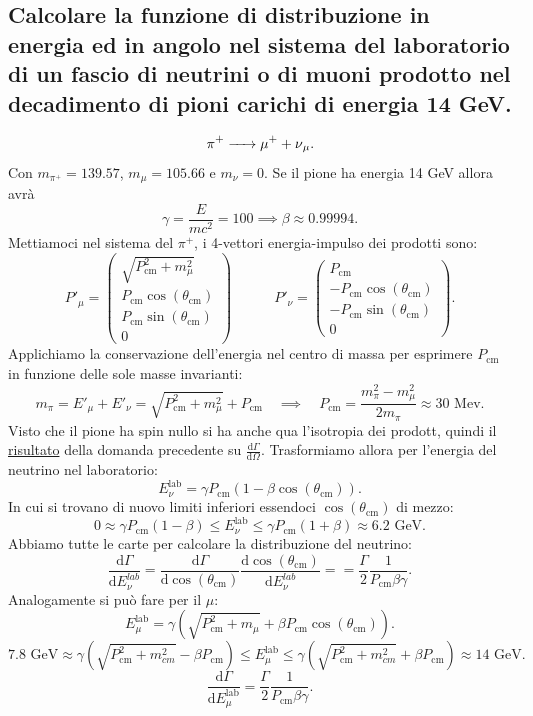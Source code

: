 \subsection[\hspace{2mm} ]{Calcolare la funzione di distribuzione in energia ed in angolo nel sistema del laboratorio di un fascio di neutrini o di muoni prodotto nel decadimento di pioni carichi di energia 14 GeV.}
\[
	\ce{\ce{\pi^+} -> \ce{\mu^+} + \ce{\nu_{\mu}}}
.\] 
Con  $m_{\pi^+} = 139.57$, $m_{\mu}=105.66$ e $m_{\nu}=0$. Se il pione ha energia 14 GeV allora avrà
\[
\gamma = \frac{E}{mc^2} = 100 \implies \beta \approx 0.99994
.\] 
Mettiamoci nel sistema del $\pi^+$, i 4-vettori energia-impulso dei prodotti sono:
\[
P'_{\mu} =  
\begin{pmatrix}
	\sqrt{P_{\text{cm}}^2+m_{\mu}^2}  \\
	P_{\text{cm}}\cos\left( \theta_{\text{cm}} \right) \\
	P_{\text{cm}}\sin\left( \theta_{\text{cm}} \right) \\
	0
\end{pmatrix} \quad \quad \quad 
P'_{\nu} = 
\begin{pmatrix} 
	P_{\text{cm}} \\
	-P_{\text{cm}}\cos\left( \theta_{\text{cm}} \right) \\
	-P_{\text{cm}}\sin\left( \theta_{\text{cm}} \right) \\
	0
\end{pmatrix} 
.\] 
Applichiamo la conservazione dell'energia nel centro di massa per esprimere $P_{\text{cm}}$ in funzione delle sole masse invarianti:
\[
	m_{\pi} = E'_{\mu} + E'_{\nu} =
	\sqrt{P_{\text{cm}}^2 + m_{\mu}^2} + P_{\text{cm}} \quad \implies
	\quad P_{\text{cm}} = \frac{m_{\pi}^2 - m_{\mu}^2}{2m_{\pi}} \approx 30\text{ Mev}
.\]
Visto che il pione ha spin nullo si ha anche qua l'isotropia dei prodott, quindi il \hyperref[eq:isotropia]{risultato} della domanda precedente su $\frac{\text{d}\Gamma}{\text{d}\Omega}$.
Trasformiamo allora per l'energia del neutrino nel laboratorio:
\[
	E_{\nu}^{\text{lab}}=\gamma P_{\text{cm}} \left(1-\beta\cos\left( \theta_{\text{cm}}\right)\right) 
.\] 
In cui si trovano di nuovo limiti inferiori essendoci $\cos\left( \theta_{\text{cm}} \right) $ di mezzo:
\[
	0 \approx \gamma P_{\text{cm}}\left( 1-\beta \right) \le E_{\nu}^{\text{lab}}\le \gamma P_{\text{cm}}\left( 1+\beta \right) \approx 6.2 \text{ GeV}
.\] 
Abbiamo tutte le carte per calcolare la distribuzione del neutrino:
\[
	\frac{\mbox{d} \Gamma}{\mbox{d} E_{\nu}^{lab}} = 
	\frac{\mbox{d} \Gamma}{\text{d}\cos\left( \theta_{\text{cm}} \right) } \frac{\text{d}\cos\left( \theta_{\text{cm}} \right) }{\mbox{d} E_{\nu}^{lab}} =
	= \frac{\Gamma}{2}\frac{1}{P_{\text{cm}}\beta \gamma}
.\] 
Analogamente si può fare per il $\mu$:
\[
	E_{\mu}^{\text{lab}}=\gamma\left( \sqrt{P_{\text{cm}}^2+m_{\mu}} + \beta P_{\text{cm}}\cos\left( \theta_{\text{cm}}\right)\right)
.\] 
\[
	7.8 \text{ GeV} \approx \gamma\left( \sqrt{P_{\text{cm}}^2 + m_{cm}^2} - \beta P_{\text{cm}} \right) \le E_{\mu}^{\text{lab}} \le 
	\gamma\left( \sqrt{P_{\text{cm}}^2 + m_{cm}^2} + \beta P_{\text{cm}} \right)  \approx 14 \text{ GeV}
.\] 
\[
\frac{\mbox{d} \Gamma}{\mbox{d} E_{\mu}^{\text{lab}}} = \frac{\Gamma}{2}\frac{1}{P_{\text{cm}}\beta \gamma}
.\] 

